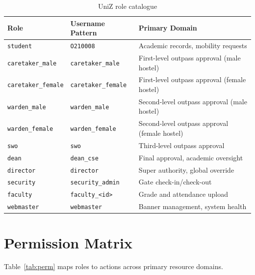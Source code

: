 \documentclass[12pt,a4paper]{report}
\newcommand{\code}[1]{\texttt{#1}}
\begin{document}
\begin{table}[H]
\centering
\caption{UniZ role catalogue}
\label{tab:roles}
\renewcommand{\arraystretch}{1.3}
\begin{tabularx}{\textwidth}{llX}
\toprule
\textbf{Role} & \textbf{Username Pattern} & \textbf{Primary Domain} \\
\midrule
\code{student}           & \code{O210008}             & Academic records, mobility requests \\
\code{caretaker\_male}   & \code{caretaker\_male}     & First-level outpass approval (male hostel) \\
\code{caretaker\_female} & \code{caretaker\_female}   & First-level outpass approval (female hostel) \\
\code{warden\_male}      & \code{warden\_male}        & Second-level outpass approval (male hostel) \\
\code{warden\_female}    & \code{warden\_female}      & Second-level outpass approval (female hostel) \\
\code{swo}               & \code{swo}                 & Third-level outpass approval \\
\code{dean}              & \code{dean\_cse}           & Final approval, academic oversight \\
\code{director}          & \code{director}            & Super authority, global override \\
\code{security}          & \code{security\_admin}     & Gate check-in/check-out \\
\code{faculty}           & \code{faculty\_<id>}       & Grade and attendance upload \\
\code{webmaster}         & \code{webmaster}           & Banner management, system health \\
\bottomrule
\end{tabularx}
\end{table}

\section{Permission Matrix}

Table~\ref{tab:perm} maps roles to actions across primary resource domains.
\end{document}
